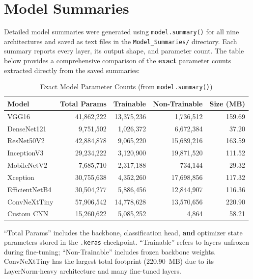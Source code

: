 \documentclass[12pt,a4paper]{article}
\newcommand{\code}[1]{\texttt{\small #1}}
\begin{document}
\section{Model Summaries}

Detailed model summaries were generated using \code{model.summary()} for all nine architectures and saved as text files in the \code{Model\_Summaries/} directory. Each summary reports every layer, its output shape, and parameter count. The table below provides a comprehensive comparison of the \textbf{exact} parameter counts extracted directly from the saved summaries:

\begin{table}[H]
\centering
\caption{Exact Model Parameter Counts (from \texttt{model.summary()})}
\label{tab:param_summary}
\begin{tabular}{l r r r r}
  \toprule
  \textbf{Model} & \textbf{Total Params} & \textbf{Trainable} & \textbf{Non-Trainable} & \textbf{Size (MB)} \\
  \midrule
  VGG16          & 41,862,222 & 13,375,236 &  1,736,512 & 159.69 \\
  DenseNet121    &  9,751,502 &  1,026,372 &  6,672,384 &  37.20 \\
  ResNet50V2     & 42,884,878 &  9,065,220 & 15,689,216 & 163.59 \\
  InceptionV3    & 29,234,222 &  3,120,900 & 19,871,520 & 111.52 \\
  MobileNetV2    &  7,685,710 &  2,317,188 &    734,144 &  29.32 \\
  Xception       & 30,755,638 &  4,352,260 & 17,698,856 & 117.32 \\
  EfficientNetB4 & 30,504,277 &  5,886,456 & 12,844,907 & 116.36 \\
  ConvNeXtTiny   & 57,906,542 & 14,778,628 & 13,570,656 & 220.90 \\
  Custom CNN     & 15,260,622 &  5,085,252 &      4,864 &  58.21 \\
  \bottomrule
\end{tabular}
\end{table}

\begin{notebox}
``Total Params'' includes the backbone, classification head, \textbf{and} optimizer state parameters stored in the \code{.keras} checkpoint. ``Trainable'' refers to layers unfrozen during fine-tuning; ``Non-Trainable'' includes frozen backbone weights. ConvNeXtTiny has the largest total footprint (220.90~MB) due to its LayerNorm-heavy architecture and many fine-tuned layers.
\end{notebox}
\end{document}
